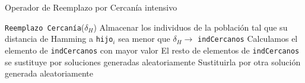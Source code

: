 \begin{algorithm}
\caption{Operador de Reemplazo por Cercanía intensivo}\label{alg:ORCv}
\begin{algorithmic}[1]
\Procedure \texttt{Reemplazo Cercanía}($\delta_H$)
	\State Almacenar los individuos de la población tal que su distancia de Hamming a \texttt{hijo$_i$} sea menor que $\delta_H \xrightarrow{}{} $ \texttt{indCercanos}
	\State Calculamos el elemento de \texttt{indCercanos} con mayor valor
	\State El resto de elementos de \texttt{indCercanos} se sustituye por soluciones generadas aleatoriamente
		\State Sustituirla por otra solución generada aleatoriamente
	\EndWhile
\EndFor
\EndProcedure
\end{algorithmic}
\end{algorithm}
